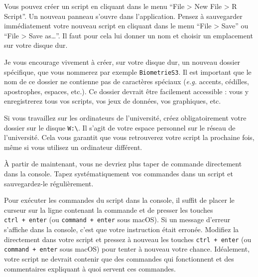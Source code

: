 \documentclass[
  a4paper,
  DIV=11,
  numbers=noendperiod,
  oneside]{scrreprt}
\begin{document}
Vous pouvez créer un script en cliquant dans le menu ``File
\textgreater{} New File \textgreater{} R Script''. Un nouveau panneau
s'ouvre dans l'application. Pensez à sauvegarder immédiatement votre
nouveau script en cliquant dans le menu ``File \textgreater{} Save'' ou
``File \textgreater{} Save as\ldots{}''. Il faut pour cela lui donner un
nom et choisir un emplacement sur votre disque dur.

\begin{tcolorbox}[enhanced jigsaw, arc=.35mm, opacityback=0, colbacktitle=quarto-callout-important-color!10!white, bottomrule=.15mm, coltitle=black, colframe=quarto-callout-important-color-frame, breakable, toprule=.15mm, title=\textcolor{quarto-callout-important-color}{\faExclamation}\hspace{0.5em}{Où sauvegarder vos scripts ? {\faIcon{save}}}, leftrule=.75mm, titlerule=0mm, bottomtitle=1mm, toptitle=1mm, left=2mm, rightrule=.15mm, opacitybacktitle=0.6, colback=white]

Je vous encourage vivement à créer, sur votre disque dur, un nouveau
dossier spécifique, que vous nommerez par exemple \texttt{BiometrieS3}.
Il est important que le nom de ce dossier ne contienne pas de caractères
spéciaux (\emph{e.g.} accents, cédilles, apostrophes, espaces, etc.). Ce
dossier devrait être facilement accessible : vous y enregistrerez tous
vos scripts, vos jeux de données, vos graphiques, etc.

Si vous travaillez sur les ordinateurs de l'université, créez
{obligatoirement} votre dossier sur le disque
\texttt{W:\textbackslash{}}. Il s'agit de votre espace personnel sur le
réseau de l'université. Cela vous garantit que vous retrouverez votre
script la prochaine fois, même si vous utilisez un ordinateur différent.

\end{tcolorbox}

À partir de maintenant, vous ne devriez plus taper de commande
directement dans la console. Tapez systématiquement vos commandes dans
un script et sauvegardez-le régulièrement.

Pour exécuter les commandes du script dans la console, il suffit de
placer le curseur sur la ligne contenant la commande et de presser les
touches \texttt{ctrl\ +\ enter} (ou \texttt{command\ +\ enter} sous
macOS). Si un message d'erreur s'affiche dans la console, c'est que
votre instruction était erronée. Modifiez la directement dans votre
script et pressez à nouveau les touches \texttt{ctrl\ +\ enter} (ou
\texttt{command\ +\ enter} sous macOS) pour tenter à nouveau votre
chance. Idéalement, votre script ne devrait contenir que des commandes
qui fonctionnent et des commentaires expliquant à quoi servent ces
commandes.
\end{document}
